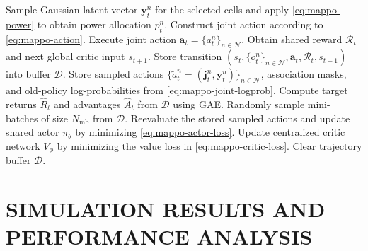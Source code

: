 \documentclass[journal]{IEEEtran}
\begin{document}
\begin{algorithm}[!b]
\begin{algorithmic}[1]
\STATE Sample Gaussian latent vector $\mathbf y_t^n$ for the selected cells and apply \eqref{eq:mappo-power} to obtain power allocation $p_t^n$.
\STATE Construct joint action according to \eqref{eq:mappo-action}.
\ENDFOR
\STATE Execute joint action $\mathbf a_t=\{a_t^n\}_{n\in\mathcal N}$.
\STATE Obtain shared reward $\mathcal R_t$ and next global critic input $s_{t+1}$.
\STATE Store transition $(s_t,\{o_t^n\}_{n\in\mathcal N},\mathbf a_t,\mathcal R_t,s_{t+1})$ into buffer $\mathcal D$.
\STATE Store sampled actions $\{\widetilde a_t^n=(\mathbf j_t^n,\mathbf y_t^n)\}_{n\in\mathcal N}$, association masks, and old-policy log-probabilities from \eqref{eq:mappo-joint-logprob}.
\ENDFOR
\STATE Compute target returns $\hat R_t$ and advantages $\hat A_t$ from $\mathcal D$ using GAE.
\STATE Randomly sample mini-batches of size $N_{\mathrm{mb}}$ from $\mathcal D$.
\STATE Reevaluate the stored sampled actions and update shared actor $\pi_{\theta}$ by minimizing \eqref{eq:mappo-actor-loss}.
\STATE Update centralized critic network $V_\phi$ by minimizing the value loss in \eqref{eq:mappo-critic-loss}.
\ENDFOR
\STATE Clear trajectory buffer $\mathcal D$.
\ENDFOR
\end{algorithmic}
\normalsize
\end{algorithm}

\section{SIMULATION RESULTS AND PERFORMANCE ANALYSIS}
\label{sec:simulation-results}
\end{document}
